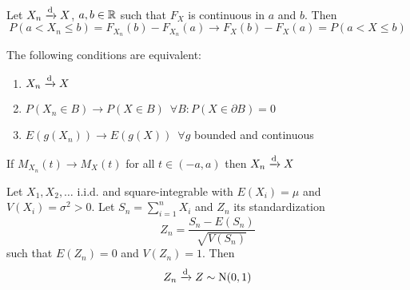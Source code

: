 \documentclass[12pt]{extarticle}
\newcommand{\Normal}{{\operatorfont N}}
\newcommand{\convdist}{\xrightarrow{\operatorfont d}}
\begin{document}
\begin{proposition}
    Let $X_n \convdist X$, $a, b \in \mathbb{R}$ such that $F_X$ is continuous in $a$ and $b$.
    Then
    \begin{equation}
        P(a < X_n \leq b) = F_{X_n}(b) - F_{X_n}(a) \to F_X(b) - F_X(a) = P(a < X \leq b)
    \end{equation}
\end{proposition}

\begin{theorem}[Portmanteaux]
    \label{thm:conv:portmanteaux}
    The following conditions are equivalent:
    \begin{enumerate}
        \item $X_n \convdist X$
        \item $P(X_n \in B) \to P(X \in B) \enspace \forall B: P(X \in \partial B) = 0$
        \item $E(g(X_n)) \to E(g(X)) \enspace \forall g$ bounded and continuous
    \end{enumerate}
\end{theorem}

\begin{theorem}
    If $M_{X_n}(t) \to M_X(t)$ for all $t \in (-a, a)$ then $X_n \convdist X$
\end{theorem}

\begin{theorem}
    Let $X_1, X_2, \ldots$ i.i.d. and square-integrable with $E(X_i) = \mu$ and $V(X_i) = \sigma^2 > 0$.
    Let $S_n = \sum_{i = 1}^n X_i$ and $Z_n$ its standardization
    \begin{equation}
        Z_n = \frac{S_n - E(S_n)}{\sqrt{V(S_n)}}
    \end{equation}
    such that $E(Z_n) = 0$ and $V(Z_n) = 1$.
    Then
    \begin{equation}
        Z_n \convdist Z \sim \Normal(0, 1)
    \end{equation}
\end{theorem}
\end{document}
